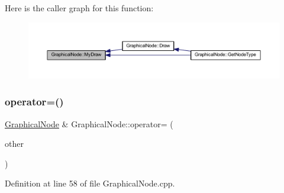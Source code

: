 Here is the caller graph for this function\+:
\nopagebreak
\begin{figure}[H]
\begin{center}
\leavevmode
\includegraphics[width=350pt]{class_graphical_node_a4a5d4f48454a9721a940499d4f59b0ce_icgraph}
\end{center}
\end{figure}
\mbox{\label{class_graphical_node_a9c5dc1b7f344e2785531318167c2826b}} 
\subsubsection{\texorpdfstring{operator=()}{operator=()}}
{\footnotesize\ttfamily \hyperlink{class_graphical_node}{Graphical\+Node} \& Graphical\+Node\+::operator= (\begin{DoxyParamCaption}\item[{const \hyperlink{class_graphical_node}{Graphical\+Node} \&}]{other }\end{DoxyParamCaption})}



Definition at line 58 of file Graphical\+Node.\+cpp.

